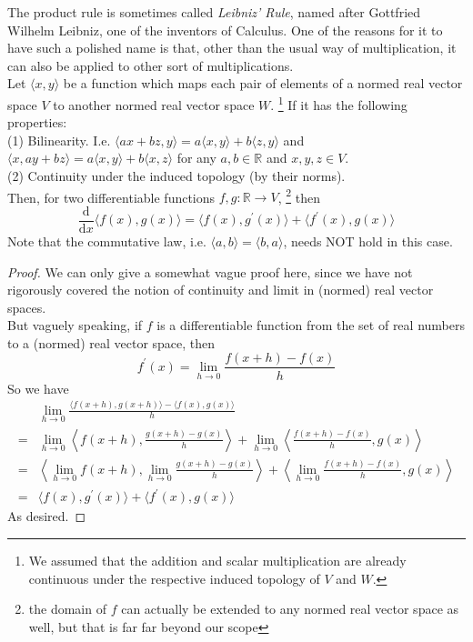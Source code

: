 The product rule is sometimes called \textit{Leibniz' Rule}, named after Gottfried Wilhelm Leibniz, one of the inventors of Calculus.
One of the reasons for it to have such a polished name is that, other than the usual way of multiplication, it can also be applied to other sort of multiplications.\\
Let $\langle x,y\rangle$ be a function which maps each pair of elements of a normed real vector space $V$ to another normed real vector space $W$.
\footnote{We assumed that the addition and scalar multiplication are already continuous under the respective induced topology of $V$ and $W$.}
If it has the following properties:\\
(1) Bilinearity. I.e. $\langle ax+bz,y\rangle=a\langle x,y\rangle+b\langle z,y\rangle$ and $\langle x,ay+bz\rangle=a\langle x,y\rangle+b\langle x,z\rangle$ for any $a,b\in\mathbb R$ and $x,y,z\in V$.\\
(2) Continuity under the induced topology (by their norms).\\
Then, for two differentiable functions $f,g:\mathbb R\to V$,
\footnote{the domain of $f$ can actually be extended to any normed real vector space as well, but that is far far beyond our scope}
then
$$\frac{\mathrm d}{\mathrm dx}\langle f(x),g(x)\rangle=\langle f(x),g^\prime (x)\rangle+\langle f^\prime(x),g(x)\rangle$$
Note that the commutative law, i.e. $\langle a,b\rangle=\langle b,a\rangle$, needs NOT hold in this case.
\begin{proof}
    We can only give a somewhat vague proof here, since we have not rigorously covered the notion of continuity and limit in (normed) real vector spaces.\\
    But vaguely speaking, if $f$ is a differentiable function from the set of real numbers to a (normed) real vector space, then 
    $$f^\prime(x)=\lim_{h\to 0}\frac{f(x+h)-f(x)}{h}$$
    So we have
    \begin{align*}
        &\lim_{h\to0}\frac{\langle f(x+h),g(x+h)\rangle-\langle f(x), g(x)\rangle}{h}\\
        =&\lim_{h\to0}\left\langle f(x+h),\frac{g(x+h)-g(x)}{h}\right\rangle+\lim_{h\to0}\left\langle\frac{f(x+h)-f(x)}{h},g(x)\right\rangle\tag{Bilinearity}\\
        =&\left\langle \lim_{h\to0}f(x+h),\lim_{h\to0}\frac{g(x+h)-g(x)}{h}\right\rangle+\left\langle\lim_{h\to0}\frac{f(x+h)-f(x)}{h},g(x)\right\rangle\tag{Continuity}\\
        =&\langle f(x),g^\prime (x)\rangle+\langle f^\prime(x),g(x)\rangle
    \end{align*}
    As desired.
\end{proof}
